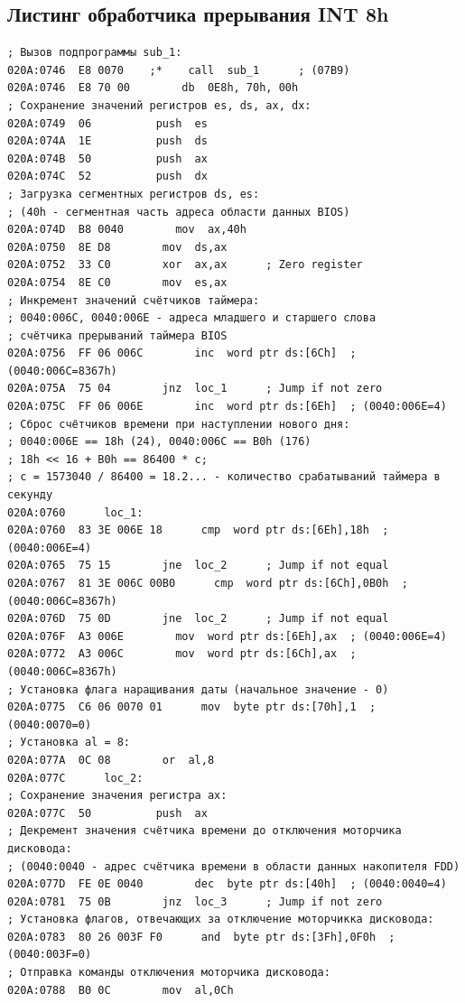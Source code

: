 \documentclass[a4paper,12pt]{article}
\begin{document}
\subsection{Листинг обработчика прерывания INT 8h} 
\begin{lstlisting}[style={asm}]
; Вызов подпрограммы sub_1:
020A:0746  E8 0070    ;*    call  sub_1      ; (07B9)
020A:0746  E8 70 00        db  0E8h, 70h, 00h
; Сохранение значений регистров es, ds, ax, dx:
020A:0749  06          push  es
020A:074A  1E          push  ds
020A:074B  50          push  ax
020A:074C  52          push  dx
; Загрузка сегментных регистров ds, es: 
; (40h - сегментная часть адреса области данных BIOS)
020A:074D  B8 0040        mov  ax,40h
020A:0750  8E D8        mov  ds,ax
020A:0752  33 C0        xor  ax,ax      ; Zero register
020A:0754  8E C0        mov  es,ax
; Инкремент значений счётчиков таймера:
; 0040:006C, 0040:006E - адреса младшего и старшего слова 
; счётчика прерываний таймера BIOS
020A:0756  FF 06 006C        inc  word ptr ds:[6Ch]  ; (0040:006C=8367h)
020A:075A  75 04        jnz  loc_1      ; Jump if not zero
020A:075C  FF 06 006E        inc  word ptr ds:[6Eh]  ; (0040:006E=4)
; Сброс счётчиков времени при наступлении нового дня:
; 0040:006E == 18h (24), 0040:006C == B0h (176)
; 18h << 16 + B0h == 86400 * c; 
; c = 1573040 / 86400 = 18.2... - количество срабатываний таймера в секунду
020A:0760      loc_1:
020A:0760  83 3E 006E 18      cmp  word ptr ds:[6Eh],18h  ; (0040:006E=4)
020A:0765  75 15        jne  loc_2      ; Jump if not equal
020A:0767  81 3E 006C 00B0      cmp  word ptr ds:[6Ch],0B0h  ; (0040:006C=8367h)
020A:076D  75 0D        jne  loc_2      ; Jump if not equal
020A:076F  A3 006E        mov  word ptr ds:[6Eh],ax  ; (0040:006E=4)
020A:0772  A3 006C        mov  word ptr ds:[6Ch],ax  ; (0040:006C=8367h)
; Установка флага наращивания даты (начальное значение - 0)
020A:0775  C6 06 0070 01      mov  byte ptr ds:[70h],1  ; (0040:0070=0)
; Установка al = 8:
020A:077A  0C 08        or  al,8
020A:077C      loc_2:
; Сохранение значения регистра ax:
020A:077C  50          push  ax
; Декремент значения счётчика времени до отключения моторчика дисковода:
; (0040:0040 - адрес счётчика времени в области данных накопителя FDD)
020A:077D  FE 0E 0040        dec  byte ptr ds:[40h]  ; (0040:0040=4)
020A:0781  75 0B        jnz  loc_3      ; Jump if not zero
; Установка флагов, отвечающих за отключение моторчикка дисковода:
020A:0783  80 26 003F F0      and  byte ptr ds:[3Fh],0F0h  ; (0040:003F=0)
; Отправка команды отключения моторчика дисковода:
020A:0788  B0 0C        mov  al,0Ch

\end{lstlisting}
\end{document}
